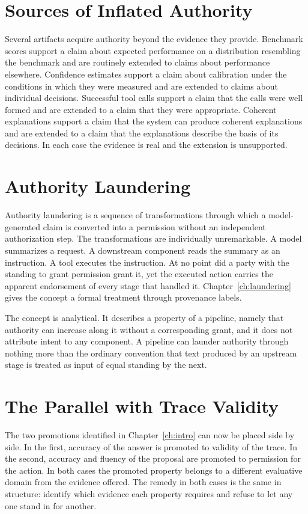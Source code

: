 \section{Sources of Inflated Authority}

Several artifacts acquire authority beyond the evidence they provide. Benchmark scores support a claim about expected performance on a distribution resembling the benchmark and are routinely extended to claims about performance elsewhere. Confidence estimates support a claim about calibration under the conditions in which they were measured and are extended to claims about individual decisions. Successful tool calls support a claim that the calls were well formed and are extended to a claim that they were appropriate. Coherent explanations support a claim that the system can produce coherent explanations and are extended to a claim that the explanations describe the basis of its decisions. In each case the evidence is real and the extension is unsupported.

\section{Authority Laundering}

Authority laundering is a sequence of transformations through which a model-generated claim is converted into a permission without an independent authorization step. The transformations are individually unremarkable. A model summarizes a request. A downstream component reads the summary as an instruction. A tool executes the instruction. At no point did a party with the standing to grant permission grant it, yet the executed action carries the apparent endorsement of every stage that handled it. Chapter~\ref{ch:laundering} gives the concept a formal treatment through provenance labels.

The concept is analytical. It describes a property of a pipeline, namely that authority can increase along it without a corresponding grant, and it does not attribute intent to any component. A pipeline can launder authority through nothing more than the ordinary convention that text produced by an upstream stage is treated as input of equal standing by the next.

\section{The Parallel with Trace Validity}

The two promotions identified in Chapter~\ref{ch:intro} can now be placed side by side. In the first, accuracy of the answer is promoted to validity of the trace. In the second, accuracy and fluency of the proposal are promoted to permission for the action. In both cases the promoted property belongs to a different evaluative domain from the evidence offered. The remedy in both cases is the same in structure: identify which evidence each property requires and refuse to let any one stand in for another.

